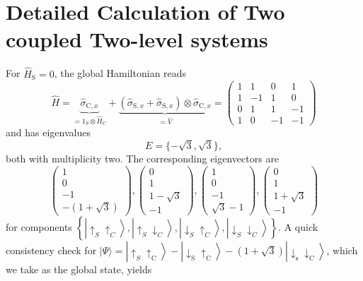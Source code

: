 \chapter{Detailed Calculation of Two coupled Two-level systems\label{app:chap3_appendix}}
For $\hat{H}_{\mathrm{S}}=0$, the global Hamiltonian reads
$$
\hat{H}=\underbrace{\hat{\sigma}_{\mathrm{C}, x}}_{=1_S \otimes \hat{H}_{\mathrm{C}}}+\underbrace{\left(\hat{\sigma}_{\mathrm{S}, x}+\hat{\sigma}_{\mathrm{S}, x}\right) \otimes \hat{\sigma}_{\mathrm{C}, x}}_{=\hat{V}}=\left(\begin{array}{cccc}
1 & 1 & 0 & 1 \\
1 & -1 & 1 & 0 \\
0 & 1 & 1 & -1 \\
1 & 0 & -1 & -1
\end{array}\right)
$$
and has eigenvalues
$$
E=\{-\sqrt{3}, \sqrt{3}\},
$$
both with multiplicity two. The corresponding eigenvectors are
$$
\left(\begin{array}{c}
1 \\
0 \\
-1 \\
-(1+\sqrt{3})
\end{array}\right),\left(\begin{array}{c}
0 \\
1 \\
1-\sqrt{3} \\
-1
\end{array}\right),\left(\begin{array}{c}
1 \\
0 \\
-1 \\
\sqrt{3}-1
\end{array}\right),\left(\begin{array}{c}
0 \\
1 \\
1+\sqrt{3} \\
-1
\end{array}\right)
$$
for components $\left\{\left|\uparrow_S \uparrow_C\right\rangle,\left|\uparrow_S \downarrow_C\right\rangle,\left|\downarrow_S \uparrow_C\right\rangle,\left|\downarrow_S \downarrow_C\right\rangle\right\}$. A quick consistency check for $|\Psi\rangle=\left|\uparrow_S \uparrow_{\mathrm{C}}\right\rangle-\left|\downarrow_{\mathrm{S}} \uparrow_{\mathrm{C}}\right\rangle-(1+\sqrt{3})\left|\downarrow_{\mathrm{s}} \downarrow_{\mathrm{C}}\right\rangle$, which we take as the global state, yields
